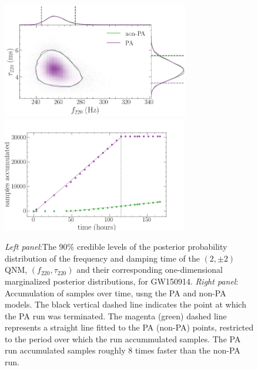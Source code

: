 \documentclass[twocolumn,prd,aps,superscriptaddress,preprintnumbers,tightenlines,showpacs,nofootinbib,eqsecnum,amsfonts,amsmath]{revtex4-1}
\begin{document}
\begin{figure}
  \centering
  \includegraphics[height=5cm]{GW150914_actual_PA_nonPA_fngrtaungr}\includegraphics[height=5cm]{GW150914_actual_PA_nonPA_benchmarking}
  \caption{\emph{Left panel}:The 90\% credible levels of the posterior probability distribution of the frequency and damping time of the $(2,\pm 2)$ QNM, $(f_{220},\tau_{220})$ and their corresponding one-dimensional marginalized posterior distributions, for GW150914. \emph{Right panel}: Accumulation of samples over time, usng the PA and non-PA models. The black vertical dashed line indicates the point at which the PA run was terminated. The magenta (green) dashed line represents a straight line fitted to the PA (non-PA) points, restricted to the period over which the run accummulated samples. The PA run accumulated samples roughly 8 times faster than the non-PA run.}
  \label{fig:pa_nonpa_tgr}
\end{figure}




\end{document}
